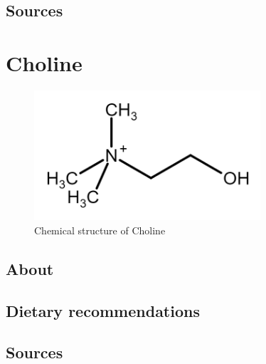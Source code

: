 \documentclass{book}
\begin{document}
\begin{sloppypar}
\section{Sources}


\chapter{Choline}
\begin{figure}[h]
	\caption{Chemical structure of Choline}
	\centering \includegraphics[width=0.75\textwidth]{images/Choline_chemical_structure}
\end{figure}
\newpage

\section{About}


\section{Dietary recommendations}


\section{Sources}


\end{sloppypar}

\listoffigures
\listoftables
\end{document}
